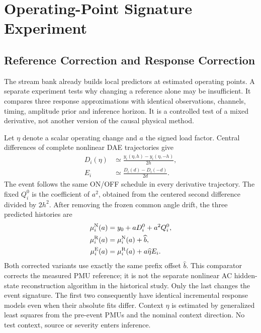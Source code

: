 \section{Operating-Point Signature Experiment}
\label{sec:ei-x02}

\subsection{Reference Correction and Response Correction}
The stream bank already builds local predictors at estimated operating
points. A separate experiment tests why changing a reference alone may be
insufficient. It compares three response approximations with identical
observations, channels, timing, amplitude prior and inference horizon.
It is a controlled test of a mixed derivative, not another version of the causal physical method.

Let $\eta$ denote a scalar operating change and $a$ the signed load factor.
Central differences of complete nonlinear DAE trajectories give
\begin{align}
 D_i(\eta)&\simeq\frac{y_i(\eta,h)-y_i(\eta,-h)}{2h},\nonumber\\
 E_i&\simeq\frac{D_i(d)-D_i(-d)}{2d}.
 \label{eq:ei-mixed-response}
\end{align}
The event follows the same ON/OFF schedule in every derivative trajectory.
The fixed $Q_i^0$ is the coefficient of $a^2$, obtained from the centered
second difference divided by $2h^2$. After removing the frozen common
angle drift, the three predicted histories are
\begin{align}
 \mu_i^{\rm N}(a)&=y_0+aD_i^0+a^2Q_i^0,\nonumber\\
 \mu_i^{\rm R}(a)&=\mu_i^{\rm N}(a)+\widehat b,\nonumber\\
 \mu_i^{\rm E}(a)&=\mu_i^{\rm R}(a)+a\widehat\eta E_i.
 \label{eq:ei-three-predictions}
\end{align}
Both corrected variants use exactly the same prefix offset $\widehat b$.
This comparator corrects the measured PMU reference; it is not the separate
nonlinear AC hidden-state reconstruction algorithm in the historical study.
Only the last changes the event signature. The first two consequently
have identical incremental response models even when their absolute fits
differ. Context $\widehat\eta$ is estimated by generalized least squares
from the pre-event PMUs and the nominal context direction. No test context,
source or severity enters inference.



